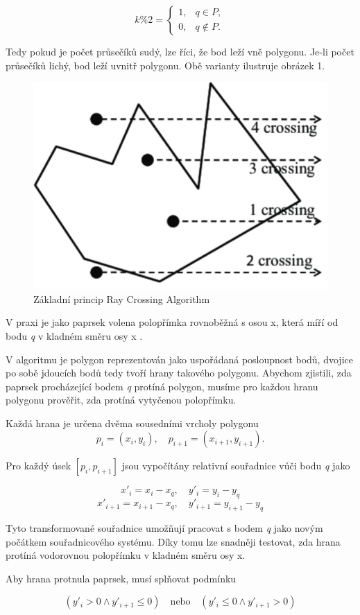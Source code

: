 \documentclass[a4paper,12pt]{article}
\begin{document}
\[
k\%2 =
\begin{cases} 
    1, & q \in P, \\
    0, & q \notin P.
\end{cases}
\]

Tedy pokud je počet průsečíků sudý, lze říci, že bod leží vně polygonu. Je-li počet průsečíků lichý, bod leží uvnitř polygonu. Obě varianty ilustruje obrázek 1.

\begin{figure}[H]
    \centering
    \includegraphics[width=0.4\linewidth]{ray_cross_1.PNG}
    \caption{Základní princip Ray Crossing Algorithm \parencite{obr1}}
    \label{fig:enter-label}
\end{figure}

V praxi je jako paprsek volena polopřímka rovnoběžná s osou x, která míří od bodu \textit{q} v kladném směru osy x \parencite{geeks}.

V algoritmu je polygon reprezentován jako uspořádaná posloupnost bodů, dvojice po sobě jdoucích bodů tedy tvoří hrany takového polygonu. Abychom zjistili, zda paprsek procházející bodem \textit{q} protíná polygon, musíme pro každou hranu polygonu prověřit, zda protíná vytyčenou polopřímku.

Každá hrana je určena dvěma sousedními vrcholy polygonu
\[
p_i = (x_i, y_i), \quad p_{i+1} = (x_{i+1}, y_{i+1}).
\]

Pro každý úsek \([p_i, p_{i+1}]\) jsou vypočítány relativní souřadnice vůči bodu \textit{q} jako

\[
x'_i = x_i - x_q, \quad y'_i = y_i - y_q
\]
\[
x'_{i+1} = x_{i+1} - x_q, \quad y'_{i+1} = y_{i+1} - y_q
\]

Tyto transformované souřadnice umožňují pracovat s bodem \textit{q} jako novým počátkem souřadnicového systému. Díky tomu lze snadněji testovat, zda hrana protíná vodorovnou polopřímku v kladném směru osy x.

Aby hrana protnula paprsek, musí splňovat podmínku

\[
(y'_i > 0 \land y'_{i+1} \leq 0) \quad \text{nebo} \quad (y'_i \leq 0 \land y'_{i+1} > 0)
\]
\end{document}

